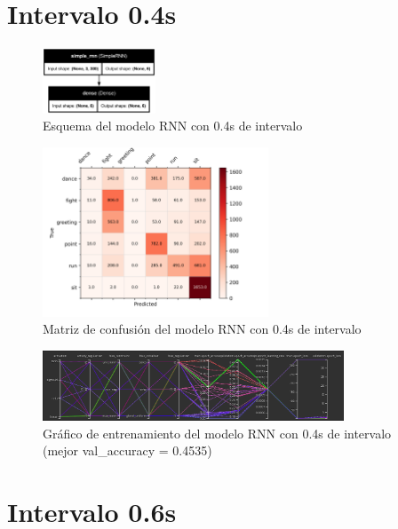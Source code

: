 \section{Intervalo 0.4s}

\begin{figure}[H]
    \centering
    \includegraphics[width=0.3\textwidth]{Imagenes/Bitmap/best-rnn0.4.png}
    \caption{Esquema del modelo RNN con 0.4s de intervalo}
    \label{fig:rnn-0.4-final}
\end{figure}
\begin{figure}[H]
    \centering
    \includegraphics[width=0.6\textwidth]{Imagenes/Bitmap/CM_best-rnn0.4.png}
    \caption{Matriz de confusión del modelo RNN con 0.4s de intervalo}
    \label{fig:rnn-0.4-matriz}
\end{figure}

\begin{figure}[H]
    \centering
    \includegraphics[width=0.8\textwidth]{Imagenes/Bitmap/tb-rnn-0.4.png}
    \caption{Gráfico de entrenamiento del modelo RNN con 0.4s de intervalo (mejor val\_accuracy = 0.4535)}
    \label{fig:rnn-0.4-grafico}
\end{figure}

\section{Intervalo 0.6s}

